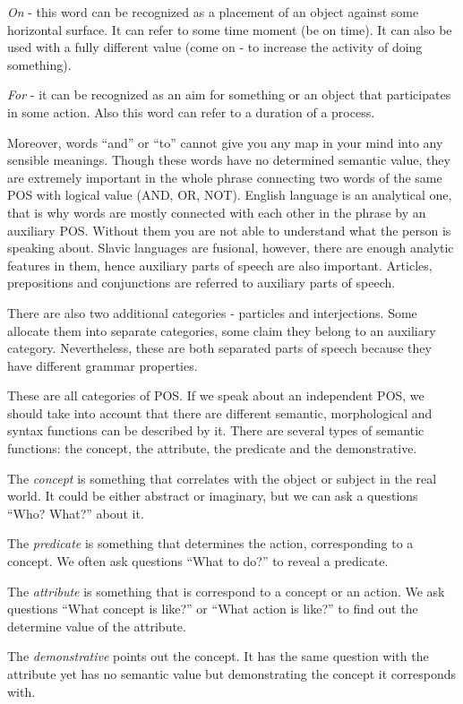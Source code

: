 \textit{On} - this word can be recognized as a placement of an object against some horizontal surface. It can refer to some time moment (be on time). It can also be used with a fully different value (come on - to increase the activity of doing something).

\textit{For} - it can be recognized as an aim for something or an object that participates in some action. Also this word can refer to a duration of a process.

Moreover, words “and” or “to” cannot give you any map in your mind into any sensible meanings. Though these words have no determined semantic value, they are extremely important in the whole phrase connecting two words of the same POS with logical value (AND, OR, NOT). English language is an analytical one, that is why words are mostly connected with each other in the phrase by an auxiliary POS. Without them you are not able to understand what the person is speaking about. Slavic languages are fusional, however, there are enough analytic features in them, hence auxiliary parts of speech are also important. Articles, prepositions and conjunctions are referred to auxiliary parts of speech.

There are also two additional categories - particles and interjections. Some allocate them into separate categories, some claim they belong to an auxiliary category. Nevertheless, these are both separated parts of speech because they have different grammar properties.

These are all categories of POS. If we speak about an independent POS, we should take into account that there are different semantic, morphological and syntax functions can be described by it. There are several types of semantic functions: the concept, the attribute, the predicate and the demonstrative.

The \textit{concept} is something that correlates with the object or subject in the real world. It could be either abstract or imaginary, but we can ask a questions “Who? What?” about it.

The \textit{predicate} is something that determines the action, corresponding to a concept. We often ask questions “What to do?” to reveal a predicate.

The \textit{attribute} is something that is correspond to a concept or an action. We ask questions “What concept is like?” or “What action is like?” to find out the determine value of the attribute.

The \textit{demonstrative} points out the concept. It has the same question with the attribute yet has no semantic value but demonstrating the concept it corresponds with. 

